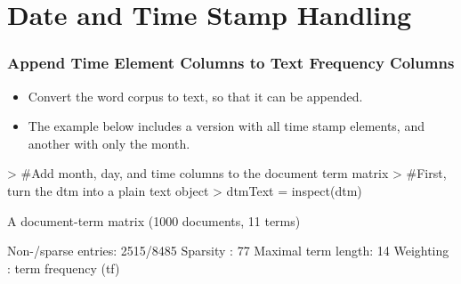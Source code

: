 \documentclass[compress,8pt]{beamer}
\begin{document}
\section{Date and Time Stamp Handling}

\begin{frame}
\frametitle{Append Time Element Columns to Text Frequency Columns}    
\begin{itemize}
\item Convert the word corpus to text, so that it can be appended.
\item The example below includes a version with all time stamp elements, and another with only the month.
\end{itemize}  
\begin{Schunk}
\begin{Sinput}
> #Add month, day, and time columns to the document term matrix
> #First, turn the dtm into a plain text object
> dtmText = inspect(dtm)
\end{Sinput}
A document-term matrix (1000 documents, 11 terms)

Non-/sparse entries: 2515/8485
Sparsity           : 77%
Maximal term length: 14 
Weighting          : term frequency (tf)


\end{Schunk}
\end{frame}
\end{document}
